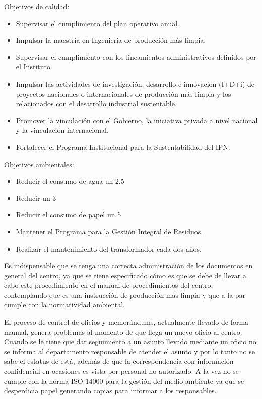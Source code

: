 Objetivos de calidad:

\begin{itemize}
	\item Supervisar el cumplimiento del plan operativo anual.
	\item Impulsar la maestría en Ingeniería de producción más limpia.
	\item Supervisar el cumplimiento con los lineamientos administrativos definidos por el Instituto.
	\item Impulsar las actividades de investigación, desarrollo e innovación (I+D+i) de proyectos nacionales o internacionales de producción más limpia y los relacionados con el desarrollo industrial sustentable.
 \item Promover la vinculación con el Gobierno, la iniciativa privada a nivel nacional y la vinculación internacional.
	\item Fortalecer el Programa Institucional para la Sustentabilidad del IPN.
\end{itemize}

Objetivos ambientales:

\begin{itemize}
	\item Reducir el consumo de agua un 2.5%
	\item Reducir un 3%
	\item Reducir el consumo de papel un 5%
	\item Mantener el Programa para la Gestión Integral de Residuos.
	\item Realizar el mantenimiento del transformador cada dos años.
\end{itemize}

Es indispensable que se tenga una correcta administración de los documentos en general del centro, ya que se tiene especificado cómo es que se debe de llevar a cabo este procedimiento en el manual de procedimientos del centro, contemplando que es una instrucción de producción más limpia y que a la par cumple con la normatividad ambiental.

El proceso de control de oficios y memorándums, actualmente llevado de forma manual, genera problemas al momento de que llega un nuevo oficio al centro. Cuando se le tiene que dar seguimiento a un asunto llevado mediante un oficio no se informa al departamento responsable de atender el asunto y por lo tanto no se sabe el estatus de está, además de que la correspondencia con información confidencial en ocasiones es vista por personal no autorizado. A la vez no se cumple con la norma ISO 14000 para la gestión del medio ambiente ya que se desperdicia papel generando copias para informar a los responsables.


